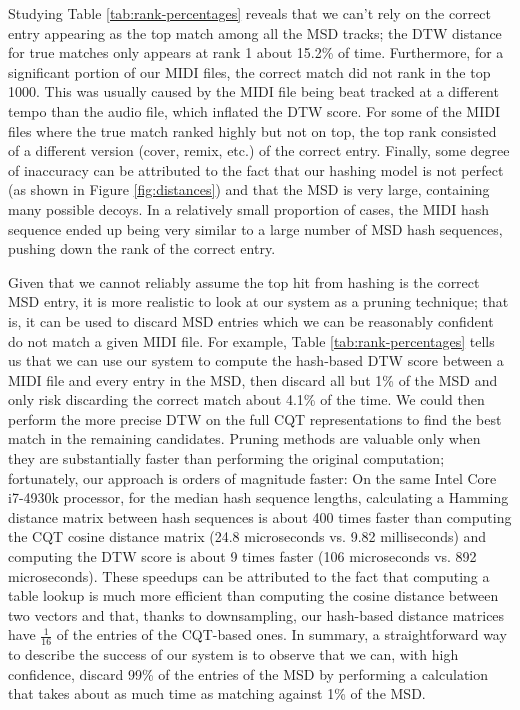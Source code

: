 \documentclass{article}
\begin{document}
Studying Table \ref{tab:rank-percentages} reveals that we can't rely on the correct entry appearing as the top match among all the MSD tracks; the DTW distance for true matches only appears at rank 1 about 15.2\% of time.
Furthermore, for a significant portion of our MIDI files, the correct match did not rank in the top 1000.
This was usually caused by the MIDI file being beat tracked at a different tempo than the audio file, which inflated the DTW score.
For some of the MIDI files where the true match ranked highly but not on top, the top rank consisted of a different version (cover, remix, etc.) of the correct entry.
Finally, some degree of inaccuracy can be attributed to the fact that our hashing model is not perfect (as shown in Figure \ref{fig:distances}) and that the MSD is very large, containing many possible decoys. 
In a relatively small proportion of cases, the MIDI hash sequence ended up being very similar to a large number of MSD hash sequences, pushing down the rank of the correct entry.

Given that we cannot reliably assume the top hit from hashing is the correct MSD entry, it is more realistic to look at our system as a pruning technique; that is, it can be used to discard MSD entries which we can be reasonably confident do not match a given MIDI file.
For example, Table \ref{tab:rank-percentages} tells us that we can use our system to compute the hash-based DTW score between a MIDI file and every entry in the MSD, then discard all but 1\% of the MSD and only risk discarding the correct match about 4.1\% of the time.
We could then perform the more precise DTW on the full CQT representations to find the best match in the remaining candidates.
Pruning methods are valuable only when they are substantially faster than performing the original computation; fortunately, our approach is orders of magnitude faster:
On the same Intel Core i7-4930k processor, for the median hash sequence lengths, calculating a Hamming distance matrix between hash sequences is about 400 times faster than computing the CQT cosine distance matrix (24.8 microseconds vs. 9.82 milliseconds) and computing the DTW score is about 9 times faster (106 microseconds vs. 892 microseconds).
These speedups can be attributed to the fact that computing a table lookup is much more efficient than computing the cosine distance between two vectors and that, thanks to downsampling, our hash-based distance matrices have $\frac{1}{16}$ of the entries of the CQT-based ones.
In summary, a straightforward way to describe the success of our system is to observe that we can, with high confidence, discard 99\% of the entries of the MSD by performing a calculation that takes about as much time as matching against 1\% of the MSD.
\end{document}
